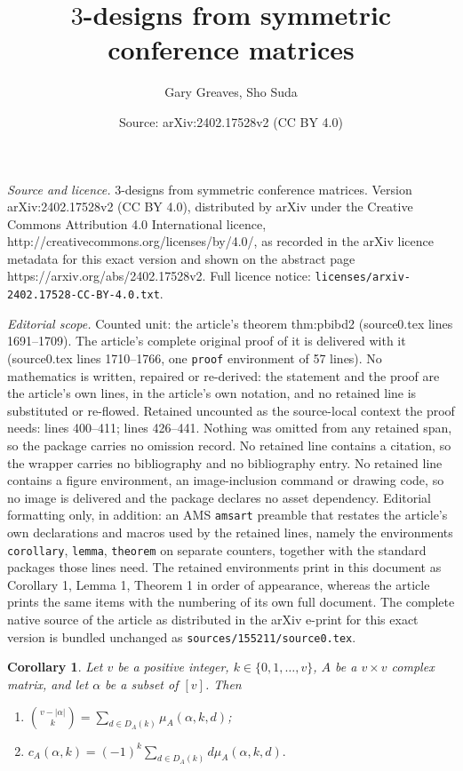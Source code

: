 \documentclass[10pt,a4paper]{amsart}
\title{$3$-designs from symmetric conference matrices}
\author{Gary Greaves, Sho Suda}
\date{Source: arXiv:2402.17528v2 (CC BY 4.0)}
\newtheorem{corollary}{Corollary}
\begin{document}
\maketitle

\noindent\emph{Source and licence.} $3$-designs from symmetric conference matrices. Version arXiv:2402.17528v2 (CC BY 4.0), distributed by arXiv under the Creative Commons Attribution 4.0 International licence, http://creativecommons.org/licenses/by/4.0/, as recorded in the arXiv licence metadata for this exact version and shown on the abstract page https://arxiv.org/abs/2402.17528v2. Full licence notice: \texttt{licenses/arxiv-2402.17528-CC-BY-4.0.txt}.\par\smallskip

\noindent\textit{Editorial scope.} Counted unit: the article's theorem thm:pbibd2 (source0.tex lines 1691--1709). The article's complete original proof of it is delivered with it (source0.tex lines 1710--1766, one \texttt{proof} environment of 57 lines). No mathematics is written, repaired or re-derived: the statement and the proof are the article's own lines, in the article's own notation, and no retained line is substituted or re-flowed.  Retained uncounted as the source-local context the proof needs: lines 400--411; lines 426--441.  Nothing was omitted from any retained span, so the package carries no omission record.  No retained line contains a citation, so the wrapper carries no bibliography and no bibliography entry.  No retained line contains a figure environment, an image-inclusion command or drawing code, so no image is delivered and the package declares no asset dependency.  Editorial formatting only, in addition: an AMS \texttt{amsart} preamble that restates the article's own declarations and macros used by the retained lines, namely the environments \texttt{corollary}, \texttt{lemma}, \texttt{theorem} on separate counters, together with the standard packages those lines need.  The retained environments print in this document as Corollary 1, Lemma 1, Theorem 1 in order of appearance, whereas the article prints the same items with the numbering of its own full document.  The complete native source of the article as distributed in the arXiv e-print for this exact version is bundled unchanged as \texttt{sources/155211/source0.tex}.
\begin{corollary}\label{cor:mu}
Let $v$ be a positive integer, $k \in \{0,1,\dots,v\}$, $A$ be a $v\times v$ complex matrix, and let $\alpha$ be a subset of $[v]$. 
Then
\begin{enumerate}
    \item $\displaystyle \binom{v-|\alpha|}{k} = \sum_{d\in D_A(k)}\mu_A(\alpha,k,d)$;
    \item  
     $\displaystyle c_A(\alpha,k)    =(-1)^{k}\sum_{d\in D_A(k)}d\mu_A(\alpha,k,d).$

\end{enumerate}
\end{corollary}
\end{document}
